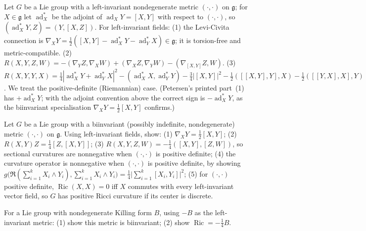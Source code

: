 \begin{remark}
  \label{rem:pet-ch3-ex-31}
  \leanok
  Let $G$ be a Lie group with a left-invariant nondegenerate metric
  $(\cdot,\cdot)$ on $\mathfrak g$; for $X\in\mathfrak g$ let
  $\operatorname{ad}_X^*$ be the adjoint of $\operatorname{ad}_XY=[X,Y]$ with
  respect to $(\cdot,\cdot)$, so $(\operatorname{ad}_X^*Y,Z)=(Y,[X,Z])$. For
  left-invariant fields:
  (1) the Levi-Civita connection is
  $\nabla_XY=\tfrac12([X,Y]-\operatorname{ad}_X^*Y-\operatorname{ad}_Y^*X)\in\mathfrak g$;
  it is torsion-free and metric-compatible.
  (2) $R(X,Y,Z,W)=-(\nabla_YZ,\nabla_XW)+(\nabla_XZ,\nabla_YW)-(\nabla_{[X,Y]}Z,W)$.
  (3)
  $R(X,Y,Y,X)=\tfrac14|\operatorname{ad}_X^*Y+\operatorname{ad}_Y^*X|^2-(\operatorname{ad}_X^*X,\operatorname{ad}_Y^*Y)-\tfrac34|[X,Y]|^2-\tfrac12([[X,Y],Y],X)-\tfrac12([[Y,X],X],Y)$.
  We treat the positive-definite (Riemannian) case. (Petersen's printed part~(1)
  has $+\operatorname{ad}_X^*Y$; with the adjoint convention above the correct
  sign is $-\operatorname{ad}_X^*Y$, as the biinvariant specialisation
  $\nabla_XY=\tfrac12[X,Y]$ confirms.)
\end{remark}

\begin{remark}
  \label{rem:pet-ch3-ex-32}
  \leanok
  Let $G$ be a Lie group with a biinvariant (possibly indefinite, nondegenerate)
  metric $(\cdot,\cdot)$ on $\mathfrak g$. Using left-invariant fields, show: (1)
  $\nabla_XY=\tfrac12[X,Y]$; (2) $R(X,Y)Z=\tfrac14[Z,[X,Y]]$; (3)
  $R(X,Y,Z,W)=-\tfrac14([X,Y],[Z,W])$, so sectional curvatures are nonnegative
  when $(\cdot,\cdot)$ is positive definite; (4) the curvature operator is
  nonnegative when $(\cdot,\cdot)$ is positive definite, by showing
  $g\big(\mathfrak R(\sum_{i=1}^kX_i\wedge Y_i),\sum_{i=1}^kX_i\wedge
  Y_i\big)=\tfrac14\big|\sum_{i=1}^k[X_i,Y_i]\big|^2$; (5) for
  $(\cdot,\cdot)$ positive
  definite, $\operatorname{Ric}(X,X)=0$ iff $X$ commutes with every left-invariant
  vector field, so $G$ has positive Ricci curvature if its center is discrete.
\end{remark}

\begin{remark}
  \label{rem:pet-ch3-ex-33}
  \leanok
  For a Lie group with nondegenerate Killing form $B$, using $-B$ as the
  left-invariant metric: (1) show this metric is biinvariant; (2) show
  $\operatorname{Ric}=-\tfrac14B$.
\end{remark}

